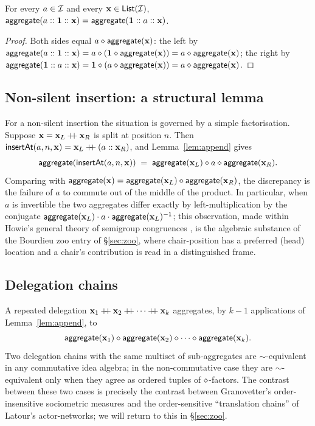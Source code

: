 \begin{lemma}\label{lem:swap-silent}
For every $a \in \mathcal{I}$ and every $\mathbf{x} \in \mathsf{List}(\mathcal{I})$,
$\mathsf{aggregate}(a :: \mathbf{1} :: \mathbf{x}) = \mathsf{aggregate}(\mathbf{1} :: a :: \mathbf{x})$.
\end{lemma}

\begin{proof}
Both sides equal $a \mathbin{\diamond} \mathsf{aggregate}(\mathbf{x})$: the left by
$\mathsf{aggregate}(a :: \mathbf{1} :: \mathbf{x}) = a \mathbin{\diamond} (\mathbf{1} \mathbin{\diamond}
\mathsf{aggregate}(\mathbf{x})) = a \mathbin{\diamond} \mathsf{aggregate}(\mathbf{x})$; the right by
$\mathsf{aggregate}(\mathbf{1} :: a :: \mathbf{x}) = \mathbf{1} \mathbin{\diamond} (a \mathbin{\diamond}
\mathsf{aggregate}(\mathbf{x})) = a \mathbin{\diamond} \mathsf{aggregate}(\mathbf{x})$.
\end{proof}

\subsection*{Non-silent insertion: a structural lemma}

For a non-silent insertion the situation is governed by a simple
factorisation. Suppose $\mathbf{x} = \mathbf{x}_L \mathbin{+\!\!+} \mathbf{x}_R$ is split at
position $n$. Then $\mathsf{insertAt}(a, n, \mathbf{x}) = \mathbf{x}_L \mathbin{+\!\!+} (a :: \mathbf{x}_R)$,
and Lemma~\ref{lem:append} gives
\[
  \mathsf{aggregate}(\mathsf{insertAt}(a, n, \mathbf{x}))
  \;=\; \mathsf{aggregate}(\mathbf{x}_L) \mathbin{\diamond} a \mathbin{\diamond} \mathsf{aggregate}(\mathbf{x}_R).
\]
Comparing with $\mathsf{aggregate}(\mathbf{x}) = \mathsf{aggregate}(\mathbf{x}_L) \mathbin{\diamond}
\mathsf{aggregate}(\mathbf{x}_R)$, the discrepancy is the failure of $a$ to commute
out of the middle of the product. In particular, when $a$ is invertible
the two aggregates differ exactly by left-multiplication by the
conjugate $\mathsf{aggregate}(\mathbf{x}_L) \cdot a \cdot \mathsf{aggregate}(\mathbf{x}_L)^{-1}$;
this observation, made within Howie's general theory of semigroup
congruences \cite{Howie1995}, is the algebraic substance of the
Bourdieu zoo entry of \S\ref{sec:zoo}, where chair-position has a
preferred (head) location and a chair's contribution is read in a
distinguished frame.

\subsection*{Delegation chains}

A repeated delegation
$\mathbf{x}_1 \mathbin{+\!\!+} \mathbf{x}_2 \mathbin{+\!\!+} \cdots \mathbin{+\!\!+} \mathbf{x}_k$ aggregates, by
$k-1$ applications of Lemma~\ref{lem:append}, to
\[
  \mathsf{aggregate}(\mathbf{x}_1) \mathbin{\diamond} \mathsf{aggregate}(\mathbf{x}_2) \mathbin{\diamond} \cdots
  \mathbin{\diamond} \mathsf{aggregate}(\mathbf{x}_k).
\]
Two delegation chains with the same multiset of sub-aggregates are
$\sim$-equivalent in any commutative idea algebra; in the
non-commutative case they are $\sim$-equivalent only when they agree
as ordered tuples of $\mathbin{\diamond}$-factors. The contrast between these
two cases is precisely the contrast between Granovetter's
order-insensitive sociometric measures and the order-sensitive
``translation chains'' of Latour's actor-networks; we will return to
this in \S\ref{sec:zoo}.

